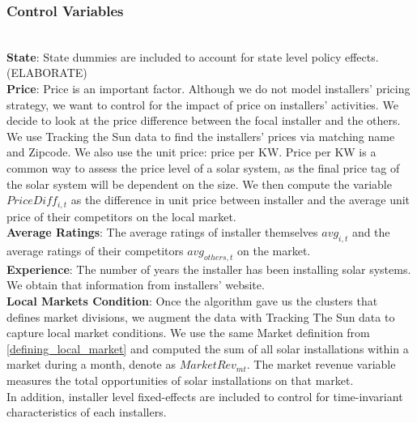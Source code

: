 \documentclass[msom,blindrev]{informs3}
\begin{document}
\subsubsection{Control Variables}\hfill\\
\textbf{State}: State dummies are included to account for state level policy effects. (ELABORATE)\\
\textbf{Price}: Price is an important factor. Although we do not model installers' pricing strategy, we want to control for the impact of price on installers' activities. We decide to look at the price difference between the focal installer and the others. We use Tracking the Sun data to find the installers' prices via matching name and Zipcode. We also use the unit price: price per KW. Price per KW is a common way to assess the price level of a solar system, as the final price tag of the solar system will be dependent on the size. We then compute the variable $PriceDiff_{i,t}$ as the difference in unit price between installer and the average unit price of their competitors on the local market. \\
\textbf{Average Ratings}: The average ratings of installer themselves $avg_{i,t}$ and the average ratings of their competitors $avg_{others,t}$ on the market. \\
\textbf{Experience}: The number of years the installer has been installing solar systems. We obtain that information from installers' website. \\
\textbf{Local Markets Condition}: Once the algorithm gave us the clusters that defines market divisions, we augment the data with Tracking The Sun data to capture local market conditions. We use the same Market definition from \ref{defining_local_market} and computed the sum of all solar installations within a market during a month, denote as $MarketRev_{mt}$. The market revenue variable measures the total opportunities of solar installations on that market. \\
In addition, installer level fixed-effects are included to control for time-invariant characteristics of each installers.
\end{document}
